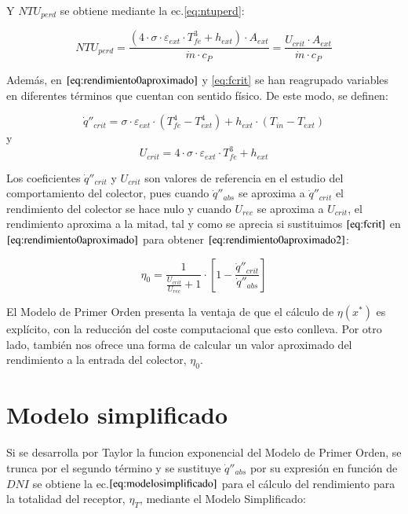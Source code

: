Y $NTU_{perd}$ se obtiene mediante la ec.\eqref{eq:ntuperd}:

 \begin{equation}
    NTU_{perd} = \frac{\left(4 \cdot \sigma \cdot \varepsilon_{ext} \cdot T^3_{fe}+h_{ext}\right) \cdot A_{ext}}{\dot m \cdot c_P} = \frac{U_{crit} \cdot A_{ext}}{\dot m \cdot c_P}
    \label{eq:ntuperd}
\end{equation}

Además, en $\eqref{eq:rendimiento0aproximado}$ y \eqref{eq:fcrit} se han reagrupado variables en diferentes términos que cuentan con sentido físico. De este modo, se definen:

\begin{equation}
    \dot q''_{crit} = \sigma \cdot \varepsilon_{ext} \cdot \left(T^{4}_{fe}- T^{4}_{ext}\right)+h_{ext} \cdot \left(T_{in}- T_{ext}\right)
    \label{eq:qcrit}
\end{equation}
y
\begin{equation}
    U_{crit} = 4 \cdot \sigma \cdot \varepsilon_{ext} \cdot T^{3}_{fe} + h_{ext}
    \label{eq:ucrit}
\end{equation}

Los coeficientes \(\dot q''_{crit}\) y \(U_{crit}\) son valores de referencia en el estudio del comportamiento del colector, pues cuando \(\dot q''_{abs}\) se aproxima a \(\dot q''_{crit}\) el rendimiento del colector se hace nulo y cuando \(U_{rec}\) se aproxima a \(U_{crit}\), el rendimiento aproxima a la mitad, tal y como se aprecia si sustituimos $\eqref{eq:fcrit}$ en $\eqref{eq:rendimiento0aproximado}$ para obtener $\eqref{eq:rendimiento0aproximado2}$:

\begin{equation}
    \eta_{0} = \frac{1}{\frac{U_{crit}}{U_{rec}}+1} \cdot \left[1-\frac{\dot q''_{crit}}{\dot q''_{abs}}\right] 
    \label{eq:rendimiento0aproximado2}
\end{equation}

El Modelo de Primer Orden presenta la ventaja de que el cálculo de \(\eta(x^{*})\) es explícito, con la reducción del coste computacional que esto conlleva. Por otro lado, también nos ofrece una forma de calcular un valor aproximado del rendimiento a la entrada del colector, \(\eta_{0}\).

\section{Modelo simplificado}
Si se desarrolla por Taylor la funcion exponencial del Modelo de Primer Orden, se trunca por el segundo término y se sustituye \(\dot q''_{abs}\) por su expresión en función de \(DNI\) se obtiene la ec.\(\eqref{eq:modelosimplificado}\) para el cálculo del rendimiento para la totalidad del receptor, $\eta_{T}$, mediante el Modelo Simplificado:


